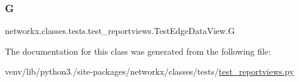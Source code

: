 \subsubsection{\texorpdfstring{G}{G}}
{\footnotesize\ttfamily networkx.\+classes.\+tests.\+test\+\_\+reportviews.\+Test\+Edge\+Data\+View.\+G}



The documentation for this class was generated from the following file\+:\begin{DoxyCompactItemize}
\item 
venv/lib/python3./site-\/packages/networkx/classes/tests/\hyperlink{test__reportviews_8py}{test\+\_\+reportviews.\+py}\end{DoxyCompactItemize}
